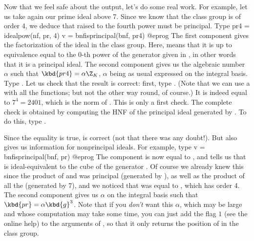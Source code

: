Now that we feel safe about the  output, let's do some real work.
For example, let us take again our prime ideal  above 7. Since we
know that the class group is of order 4, we deduce that  raised to
the fourth power must be principal. Type
\bprog
  pr4 = idealpow(nf, pr, 4)
  v = bnfisprincipal(bnf, pr4)
@eprog\noindent
The first component gives the factorization of the ideal in the class group.
Here, \kbd{[0]} means that it is up to equivalence equal to the 0-th power of
the generator  given in , in other words that it is a
principal ideal. The second component gives us the algebraic number $\alpha$
such that $\kbd{pr4}=\alpha\Z_K$, $\alpha$ being as usual expressed on the
integral basis. Type . Let us check that the result is
correct: first, type . (Note that we can use a
 with all the  functions; but not the other way round, of
course.) It is indeed equal to $7^4 = 2401$, which is the norm of .
This is only a first check. The complete check is obtained by computing the
HNF of the principal ideal generated by . To do this, type
.

Since the equality is true,  is correct (not that there was any
doubt!). But  also gives us information for nonprincipal
ideals. For example, type
\bprog
  v = bnfisprincipal(bnf, pr)
@eprog\noindent
The component  is now equal to \kbd{[3]}, and tells us that 
is ideal-equivalent to the cube of the generator . Of course we
already knew this since the product of  and  was
principal (generated by ), as well as the product of all the
 (generated by 7), and we noticed that  was equal
to , which has order 4. The second component  gives us
$\alpha$ on the integral basis such that $\kbd{pr}=\alpha \kbd{g}^3$. Note
that if you \emph{don't} want this $\alpha$, which may be large and whose
computation may take some time, you can just add the flag $1$ (see the online
help) to the arguments of , so that it only returns the
position of  in the class group. \smallskip


